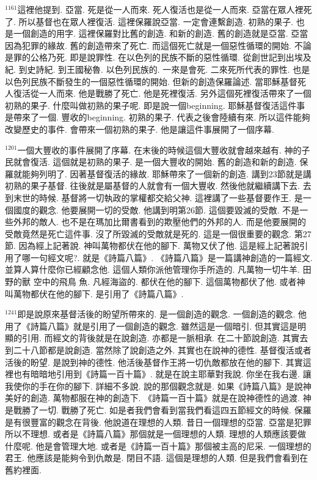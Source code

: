 \documentclass{book}
\begin{document}
$^{1161}$這裡他提到.
亞當.
死是從一人而來.
死人復活也是從一人而來.
亞當在眾人裡死了.
所以基督也在眾人裡復活.
這裡保羅說亞當.
一定會連繫創造.
初熟的果子.
也是一個創造的用字.
這裡保羅對比舊的創造.
和新的創造.
舊的創造就是亞當.
亞當因為犯罪的緣故.
舊的創造帶來了死亡.
而這個死亡就是一個惡性循環的開始.
不論是罪的公格乃死.
即是說罪性.
在以色列的民族不斷的惡性循環.
從創世記到出埃及紀.
到史詩紀.
到王國秘魯.
以色列民族的.
一來是會死.
二來死所代表的罪性.
也是以色列民族不斷發生的一個惡性循環的開始.
但新的創造保羅論述.
當耶穌基督死人復活從一人而來.
他是戰勝了死亡.
他是死裡復活.
另外這個死裡復活帶來了一個初熟的果子.
什麼叫做初熟的果子呢.
即是說一個beginning.
耶穌基督復活這件事是帶來了一個.
豐收的beginning.
初熟的果子.
代表之後會陸續有來.
所以這件能夠改變歷史的事件.
會帶來一個初熟的果子.
他是讓這件事展開了一個序幕.

$^{1201}$一個大豐收的事件展開了序幕.
在末後的時候這個大豐收就會越來越有.
神的子民就會復活.
這個就是初熟的果子.
是一個大豐收的開始.
舊的創造和新的創造.
保羅就能夠列明了.
因著基督復活的緣故.
耶穌帶來了一個新的創造.
講到23節就是講初熟的果子基督.
往後就是屬基督的人就會有一個大豐收.
然後他就繼續講下去.
去到末世的時候.
基督將一切執政的掌權都交給父神.
這裡講了一些基督要作王.
是一個國度的觀念.
他要展開一切的受敵.
他講到明第26節.
這個要毀滅的受敵.
不是一些外邦的敵人.
也不是在瑪加比爾書看到的欺壓他們的外邦的人.
而是他要展開的受敵竟然是死亡這件事.
沒了所毀滅的受敵就是死的.
這是一個很重要的觀念.
第27節.
因為經上記著說.
神叫萬物都伏在他的腳下.
萬物又伏了他.
這是經上記著說引用了哪一句經文呢?.
就是《詩篇八篇》.
《詩篇八篇》是一篇講神創造的一篇經文.
並算人算什麼你已經顧念他.
這個人類你派他管理你手所造的.
凡萬物一切牛羊.
田野的獸 空中的飛鳥 魚.
凡經海盜的.
都伏在他的腳下.
這個萬物都伏了他.
或者神叫萬物都伏在他的腳下.
是引用了《詩篇八篇》.

$^{1241}$即是說原來基督活後的盼望所帶來的.
是一個創造的觀念.
一個創造的觀念.
他用了《詩篇八篇》就是引用了一個創造的觀念.
雖然這是一個暗引.
但其實這是明顯的引用.
而經文的背後就是在說創造.
亦都是一脈相承.
在二十節說創造.
其實去到二十八節都是說創造.
當然除了說創造之外.
其實也在說神的德性.
基督復活或者活後的盼望.
是說到神的德性.
他活後基督作王將一切仇敵都放在他的腳下.
其實這裡也有暗暗地引用到《詩篇一百十篇》.
就是在說主耶華對我說.
你坐在我右邊.
讓我使你的手在你的腳下.
詳細不多說.
說的那個觀念就是.
如果《詩篇八篇》是說神美好的創造.
萬物都服在神的創造下.
《詩篇一百十篇》就是在說神德性的過渡.
神是戰勝了一切.
戰勝了死亡.
如是者我們會看到當我們看這四五節經文的時候.
保羅是有很豐富的觀念在背後.
他說道在理想的人類.
昔日一個理想的亞當.
亞當是犯罪所以不理想.
或者是《詩篇八篇》那個就是一個理想的人類.
理想的人類應該要做什麼呢.
他是會管理大地.
或者是《詩篇一百十篇》那個被主高的尼采.
一個理想的君王.
他應該是能夠令到仇敵是.
閉目不語.
這個是理想的人類.
但是我們會看到在舊約裡面.
\end{document}
